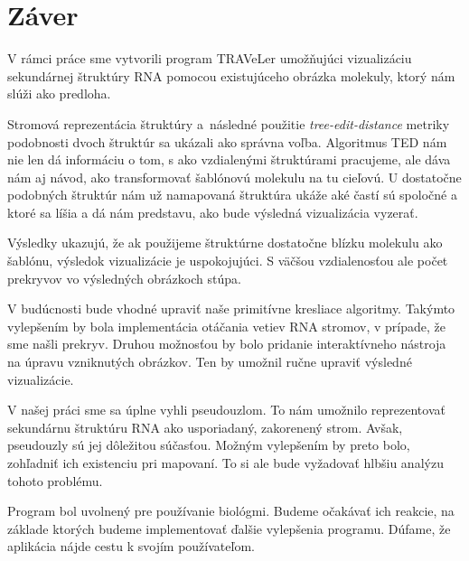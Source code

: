 \chapter*{Záver}

V rámci práce sme vytvorili program TRAVeLer umožňujúci
vizualizáciu sekundárnej štruktúry RNA pomocou existujúceho
obrázka molekuly, ktorý nám slúži ako predloha.

Stromová reprezentácia štruktúry a~následné
použitie \textit{tree-edit-distance} metriky podobnosti dvoch
štruktúr sa ukázali ako správna voľba.
Algoritmus TED nám nie len dá informáciu o tom,
s ako vzdialenými štruktúrami pracujeme, ale dáva nám
aj návod, ako transformovať šablónovú molekulu na tu cieľovú.
U dostatočne podobných štruktúr nám už namapovaná štruktúra
ukáže aké častí sú spoločné a ktoré sa líšia a dá nám
predstavu, ako bude výsledná vizualizácia vyzerať.

Výsledky ukazujú, že ak použijeme štruktúrne dostatočne blízku
molekulu ako šablónu, výsledok vizualizácie je uspokojujúci.
S väčšou vzdialenosťou ale počet prekryvov vo výsledných obrázkoch
stúpa.

V budúcnosti bude vhodné upraviť naše primitívne kresliace algoritmy.
Takýmto vylepšením by bola implementácia otáčania vetiev RNA stromov,
v prípade, že sme našli prekryv.
Druhou možnosťou by bolo pridanie interaktívneho nástroja na úpravu
vzniknutých obrázkov. Ten by umožnil ručne upraviť výsledné vizualizácie.

V našej práci sme sa úplne vyhli pseudouzlom. To nám umožnilo
reprezentovať sekundárnu štruktúru RNA ako usporiadaný, zakorenený strom.
Avšak, pseudouzly sú jej dôležitou súčasťou.
Možným vylepšením by preto bolo, zohľadniť ich existenciu pri mapovaní.
To si ale bude vyžadovať hlbšiu analýzu tohoto problému.

Program bol uvolnený pre používanie biológmi. Budeme očakávať ich reakcie,
na základe ktorých budeme implementovať ďalšie vylepšenia programu.
Dúfame, že aplikácia nájde cestu k svojím používateľom.

